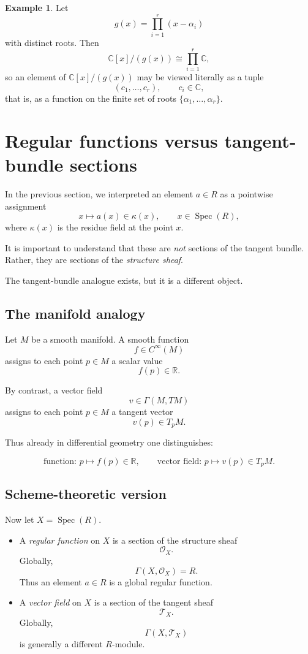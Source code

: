 \documentclass[11pt]{article}
\theoremstyle{definition}
\newtheorem{example}[theorem]{Example}
\newcommand{\C}{\mathbb{C}}
\newcommand{\Spec}{\operatorname{Spec}}
\newcommand{\kk}[1]{\kappa\!\left(#1\right)}
\begin{document}
	\begin{example}
		Let
		\[
		g(x)=\prod_{i=1}^r (x-\alpha_i)
		\]
		with distinct roots. Then
		\[
		\C[x]/(g(x))\cong \prod_{i=1}^r \C,
		\]
		so an element of \(\C[x]/(g(x))\) may be viewed literally as a tuple
		\[
		(c_1,\dots,c_r),
		\qquad c_i\in \C,
		\]
		that is, as a function on the finite set of roots \(\{\alpha_1,\dots,\alpha_r\}\).
	\end{example}
	
	\section{Regular functions versus tangent-bundle sections}
	
	In the previous section, we interpreted an element \(a\in R\) as a pointwise assignment
	\[
	x\longmapsto a(x)\in \kk{x},
	\qquad x\in \Spec(R),
	\]
	where \(\kk{x}\) is the residue field at the point \(x\).
	
	It is important to understand that these are \emph{not} sections of the tangent bundle.  
	Rather, they are sections of the \emph{structure sheaf}.
	
	The tangent-bundle analogue exists, but it is a different object.
	
	\subsection{The manifold analogy}
	
	Let \(M\) be a smooth manifold. A smooth function
	\[
	f\in C^\infty(M)
	\]
	assigns to each point \(p\in M\) a scalar value
	\[
	f(p)\in \mathbb{R}.
	\]
	
	By contrast, a vector field
	\[
	v\in \Gamma(M,TM)
	\]
	assigns to each point \(p\in M\) a tangent vector
	\[
	v(p)\in T_pM.
	\]
	
	Thus already in differential geometry one distinguishes:
	
	\[
	\text{function: }p\mapsto f(p)\in \mathbb{R},
	\qquad
	\text{vector field: }p\mapsto v(p)\in T_pM.
	\]
	
	\subsection{Scheme-theoretic version}
	
	Now let \(X=\Spec(R)\).
	
	\begin{itemize}
		\item A \emph{regular function} on \(X\) is a section of the structure sheaf
		\[
		\mathcal{O}_X.
		\]
		Globally,
		\[
		\Gamma(X,\mathcal O_X)=R.
		\]
		Thus an element \(a\in R\) is a global regular function.
		
		\item A \emph{vector field} on \(X\) is a section of the tangent sheaf
		\[
		\mathcal T_X.
		\]
		Globally,
		\[
		\Gamma(X,\mathcal T_X)
		\]
		is generally a different \(R\)-module.
	\end{itemize}
	
\end{document}
